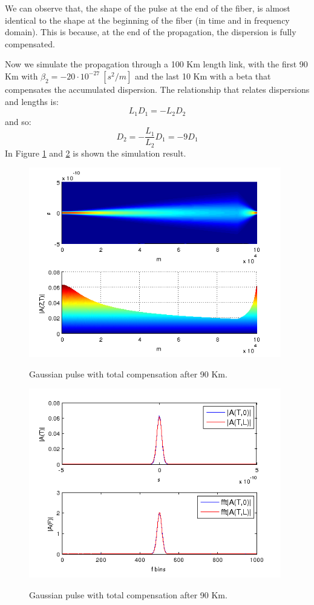 \documentclass[a4paper,10pt]{report}
\begin{document}
We can observe that, the shape of the pulse at the end of the fiber, is almost identical to the shape at the beginning of the fiber (in time and
in frequency domain). This is because, at the end of the propagation, the dispersion is fully compensated.

\newpage
Now we simulate the propagation through a 100 Km length link, with the first 90 Km with $\beta_2 = -20 \cdot 10^{-27} \ [s^2/m]$
and the last 10 Km with a beta that compensates the accumulated dispersion.
The relationship that relates dispersions and lengths is: $$L_1 D_1 = -L_2 D_2$$
and so: $$D_2=-\frac{L_1}{L_2}D_1=-9 D_1$$
In Figure \ref{es7_comp2} and \ref{es7_comp3} is shown the simulation result.


\begin{figure}[!ht]
  \centering
  \includegraphics[width=11cm]{es7_comp2.png}\\
  \caption{Gaussian pulse with total compensation after 90 Km.}
  \label{es7_comp2}
\end{figure}

\begin{figure}[!ht]
  \centering
  \includegraphics[width=11cm]{es7_comp3.png}\\
  \caption{Gaussian pulse with total compensation after 90 Km.}
  \label{es7_comp3}
\end{figure}
\end{document}
